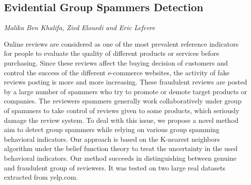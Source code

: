 \documentclass[../booklet.tex]{subfiles}
\begin{document}
\subsection[Evidential Group Spammers Detection. {\it Malika Ben Khalifa, Zied Elouedi and Eric Lefevre}]{Evidential Group Spammers Detection}
  

\begin{center}
  {\it Malika Ben Khalifa, Zied Elouedi and Eric Lefevre}
\end{center}

\vskip 0.8cm


\emph{}
Online reviews are considered as one of the most prevalent reference indicators for people to evaluate the quality of different products or services before purchasing. Since these reviews affect the buying decision of customers and control the success of the different e-commerce websites, the activity of fake reviews posting is more and more increasing. These fraudulent reviews are posted by a large number of spammers who try to promote or demote target products or companies. The reviewers spammers generally work collaboratively under group of spammers to take control of reviews given to some products, which seriously damage the review system. To deal with this issue, we propose a novel method aim to detect group spammers while relying on various group spamming behavioral indicators. Our approach is based on the K-nearest neighbors algorithm under the belief function theory to treat the uncertainty in the used behavioral indicators. Our method succeeds in distinguishing between genuine and fraudulent group of reviewers. It was tested on two large real datasets extracted from yelp.com.

\end{document}
